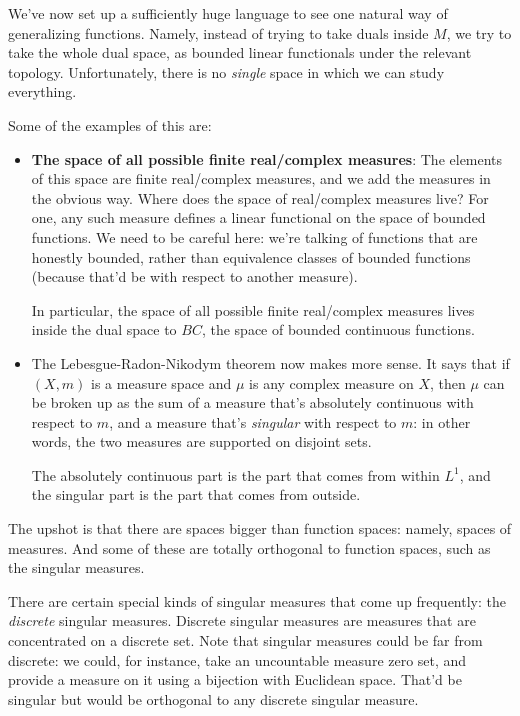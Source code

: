 \documentclass[a4paper]{amsart}
\begin{document}
We've now set up a sufficiently huge language to see one natural way
of generalizing functions. Namely, instead of trying to take duals
inside $M$, we try to take the whole dual space, as bounded linear
functionals under the relevant topology. Unfortunately, there is no
{\em single} space in which we can study everything.

Some of the examples of this are:

\begin{itemize}

\item {\bf The space of all possible finite real/complex measures}:
  The elements of this space are finite real/complex measures, and we
  add the measures in the obvious way. Where does the space of
  real/complex measures live? For one, any such measure defines a
  linear functional on the space of bounded functions. We need to be
  careful here: we're talking of functions that are honestly bounded,
  rather than equivalence classes of bounded functions (because that'd
  be with respect to another measure).

  In particular, the space of all possible finite real/complex
  measures lives inside the dual space to $BC$, the space of bounded
  continuous functions. %

\item The Lebesgue-Radon-Nikodym theorem now makes more sense. It says
  that if $(X,m)$ is a measure space and $\mu$ is any complex measure
  on $X$, then $\mu$ can be broken up as the sum of a measure that's
  absolutely continuous with respect to $m$, and a measure that's {\em
    singular} with respect to $m$: in other words, the two measures
  are supported on disjoint sets.

  The absolutely continuous part is the part that comes from within
  $L^1$, and the singular part is the part that comes from outside.

\end{itemize}

The upshot is that there are spaces bigger than function spaces:
namely, spaces of measures. And some of these are totally orthogonal
to function spaces, such as the singular measures.

There are certain special kinds of singular measures that come up
frequently: the {\em discrete} singular measures. Discrete singular
measures are measures that are concentrated on a discrete set. Note
that singular measures could be far from discrete: we could, for
instance, take an uncountable measure zero set, and provide a measure
on it using a bijection with Euclidean space. That'd be singular but
would be orthogonal to any discrete singular measure.
\end{document}
